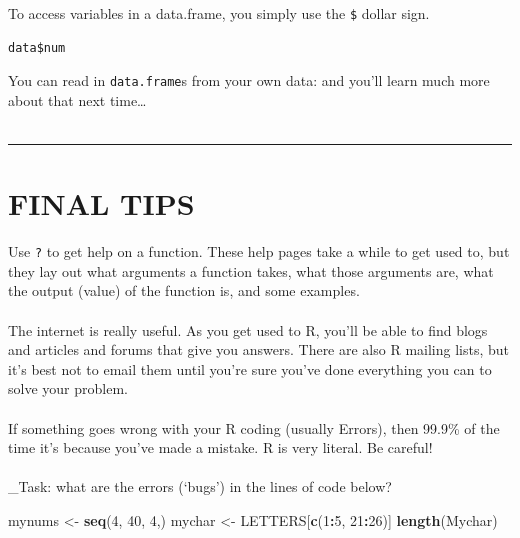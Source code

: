 \documentclass[
]{book}
\newenvironment{Shaded}{\begin{snugshade}}{\end{snugshade}}
\newcommand{\DecValTok}[1]{\textcolor[rgb]{0.00,0.00,0.81}{#1}}
\newcommand{\KeywordTok}[1]{\textcolor[rgb]{0.13,0.29,0.53}{\textbf{#1}}}
\newcommand{\NormalTok}[1]{#1}
\newcommand{\OperatorTok}[1]{\textcolor[rgb]{0.81,0.36,0.00}{\textbf{#1}}}
\newcommand{\StringTok}[1]{\textcolor[rgb]{0.31,0.60,0.02}{#1}}
\begin{document}
To access variables in a data.frame, you simply use the \texttt{\$} dollar sign.

\begin{verbatim}
data$num
\end{verbatim}

You can read in \texttt{data.frame}s from your own data: and you'll learn much more
about that next time\ldots{}\\
~\\

\begin{center}\rule{0.5\linewidth}{0.5pt}\end{center}

\hypertarget{final-tips}{%
\section{FINAL TIPS}\label{final-tips}}

Use \texttt{?} to get help on a function. These help pages take a while to get used
to, but they lay out what arguments a function takes, what those arguments
are, what the output (value) of the function is, and some examples.\\
~\\

The internet is really useful. As you get used to R, you'll be able to find
blogs and articles and forums that give you answers. There are also R mailing
lists, but it's best not to email them until you're sure you've done everything
you can to solve your problem.\\
~\\

If something goes wrong with your R coding (usually Errors), then 99.9\% of the
time it's because you've made a mistake. R is very literal. Be careful!\\
~\\

\_Task: what are the errors (`bugs') in the lines of code below?

\begin{Shaded}
\begin{Highlighting}[]
\NormalTok{mynums <-}\StringTok{ }\KeywordTok{seq}\NormalTok{(}\DecValTok{4}\NormalTok{, }\DecValTok{40}\NormalTok{, }\DecValTok{4}\NormalTok{,)}
\NormalTok{mychar <-}\StringTok{ }\NormalTok{LETTERS[}\KeywordTok{c}\NormalTok{(}\DecValTok{1}\OperatorTok{:}\DecValTok{5}\NormalTok{, }\DecValTok{21}\OperatorTok{:}\DecValTok{26}\NormalTok{)]}
\KeywordTok{length}\NormalTok{(Mychar)}
\end{Highlighting}
\end{Shaded}
\end{document}
